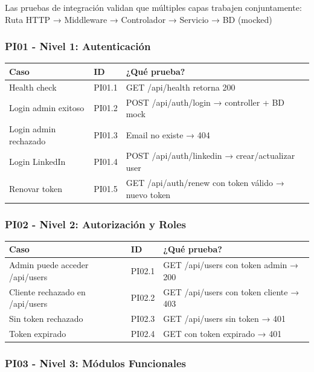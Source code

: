 Las pruebas de integración validan que múltiples capas trabajen conjuntamente:
\\
Ruta HTTP → Middleware → Controlador → Servicio → BD (mocked)

\subsubsection{PI01 - Nivel 1: Autenticación}

\begin{table}[H]
\centering
\begin{tabular}{|l|l|p{6cm}|}
\hline
\textbf{Caso} & \textbf{ID} & \textbf{¿Qué prueba?} \\ \hline
Health check & PI01.1 & GET /api/health retorna 200 \\ \hline
Login admin exitoso & PI01.2 & POST /api/auth/login → controller + BD mock \\ \hline
Login admin rechazado & PI01.3 & Email no existe → 404 \\ \hline
Login LinkedIn & PI01.4 & POST /api/auth/linkedin → crear/actualizar user \\ \hline
Renovar token & PI01.5 & GET /api/auth/renew con token válido → nuevo token \\ \hline
\end{tabular}
\end{table}

\subsubsection{PI02 - Nivel 2: Autorización y Roles}

\begin{table}[H]
\centering
\begin{tabular}{|l|l|p{6cm}|}
\hline
\textbf{Caso} & \textbf{ID} & \textbf{¿Qué prueba?} \\ \hline
Admin puede acceder /api/users & PI02.1 & GET /api/users con token admin → 200 \\ \hline
Cliente rechazado en /api/users & PI02.2 & GET /api/users con token cliente → 403 \\ \hline
Sin token rechazado & PI02.3 & GET /api/users sin token → 401 \\ \hline
Token expirado & PI02.4 & GET con token expirado → 401 \\ \hline
\end{tabular}
\end{table}

\subsubsection{PI03 - Nivel 3: Módulos Funcionales}

